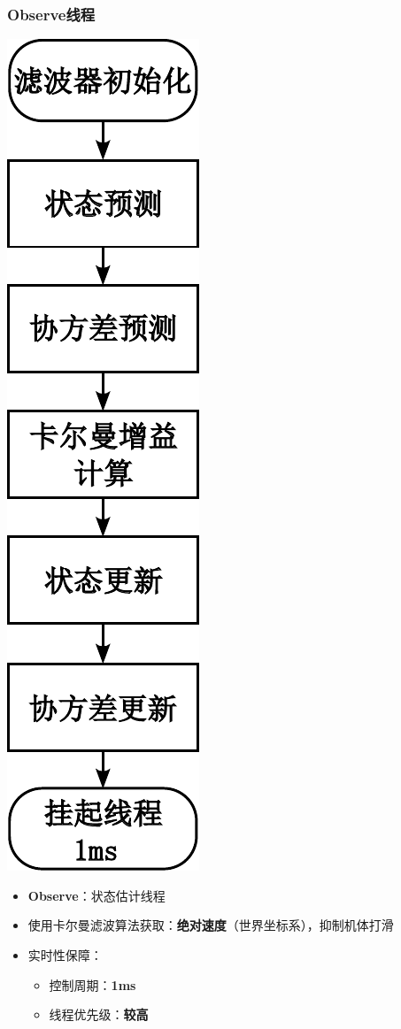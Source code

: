 \documentclass{beamer}
\begin{document}
	
	\begin{frame}
		\frametitle{Observe线程}
			\begin{minipage}[t]{0.5\linewidth}
			\vspace{-\baselineskip} %
			\centering
			\includegraphics[width=0.25\linewidth]{img/chapter5/kalman.pdf} %
		\end{minipage}%
		\hfill %
		\begin{minipage}[t]{0.4\linewidth}
			\begin{itemize}
				\item \textbf{Observe}：状态估计线程
				\item 使用卡尔曼滤波算法获取：\textbf{绝对速度}（世界坐标系），抑制机体打滑

				\item 实时性保障：
				\begin{itemize}
					\item 控制周期：\textbf{1ms}
					\item 线程优先级：\textbf{较高}
				\end{itemize}
			\end{itemize}
		\end{minipage}
		
		
	\end{frame}
	
\end{document}
